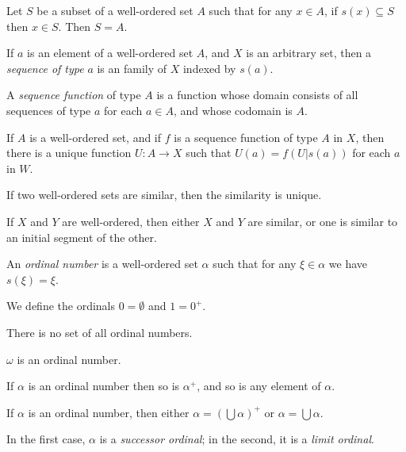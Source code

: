 \begin{thm}
  Let $S$ be a subset of a well-ordered set $A$ such that for any $x\in A$, if
  $s(x)\subseteq S$ then $x\in S$.
  Then $S=A$.
\end{thm}
\begin{defn}
  If $a$ is an element of a well-ordered set $A$, and $X$ is an arbitrary set,
  then a \emph{sequence of type} $a$ is an family of $X$ indexed by $s(a)$.

  A \emph{sequence function} of type $A$ is a function whose domain consists of
  all sequences of type $a$ for each $a\in A$, and whose codomain is $A$.
\end{defn}
\begin{prop}
  If $A$ is a well-ordered set, and if $f$ is a sequence function of type $A$ in
  $X$, then there is a unique function $U:A\to X$ such that $U(a)=f(U|s(a))$ for
  each $a$ in $W$.
\end{prop}
\begin{prop}
  If two well-ordered sets are similar, then the similarity is unique.
\end{prop}
\begin{thm}
  If $X$ and $Y$ are well-ordered, then either $X$ and $Y$ are similar, or one
  is similar to an initial segment of the other.
\end{thm}
\begin{defn}
  An \emph{ordinal number} is a well-ordered set $\alpha$ such that for any
  $\xi\in\alpha$ we have $s(\xi)=\xi$.

  We define the ordinals $0=\emptyset$ and $1=0^+$.
\end{defn}
\begin{prop}
  There is no set of all ordinal numbers.
\end{prop}
\begin{prop}
  $\omega$ is an ordinal number.
\end{prop}
\begin{prop}
  If $\alpha$ is an ordinal number then so is $\alpha^+$, and so is any element
  of $\alpha$.
\end{prop}
\begin{prop}
    If $\alpha$ is an ordinal number, then either $\alpha=(\bigcup\alpha)^+$ or
    $\alpha=\bigcup\alpha$.
\end{prop}
\begin{defn}
    In the first case, $\alpha$ is a \emph{successor ordinal}; in the second, it
    is a \emph{limit ordinal}.
\end{defn}
